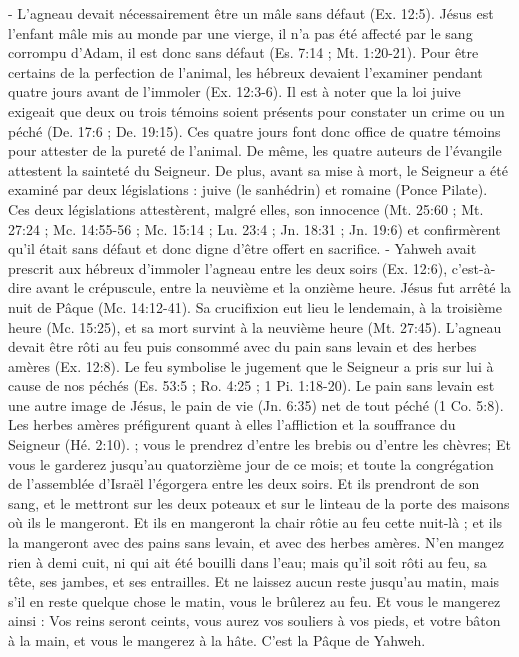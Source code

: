 \begin{multicols}{2}
{- L’agneau devait nécessairement être un mâle sans défaut (Ex. 12:5). Jésus est l’enfant mâle mis au monde par une vierge, il n’a pas été affecté par le sang corrompu d’Adam, il est donc sans défaut (Es. 7:14 ; Mt. 1:20-21). Pour être certains de la perfection de l’animal, les hébreux  devaient l’examiner pendant quatre jours avant de l’immoler (Ex. 12:3-6). Il est à noter que la loi juive exigeait que deux ou trois témoins soient présents pour constater un crime ou un péché (De. 17:6 ; De. 19:15). Ces quatre jours font donc office de quatre témoins pour attester de la pureté de l’animal. De même, les quatre auteurs de l’évangile attestent la sainteté du Seigneur. De plus, avant sa mise à mort, le Seigneur a été examiné par deux législations : juive (le sanhédrin) et  romaine (Ponce Pilate). Ces deux législations attestèrent, malgré elles, son innocence (Mt. 25:60 ;  Mt. 27:24 ; Mc. 14:55-56 ; Mc. 15:14 ; Lu. 23:4 ; Jn. 18:31 ; Jn. 19:6) et confirmèrent qu’il était sans défaut et donc digne d’être offert en sacrifice.
- Yahweh avait prescrit aux hébreux d’immoler l’agneau entre les deux soirs (Ex. 12:6), c’est-à-dire avant le crépuscule, entre  la neuvième et la onzième heure. Jésus fut arrêté la nuit de Pâque (Mc. 14:12-41). Sa crucifixion eut lieu le lendemain, à  la troisième heure (Mc. 15:25), et sa mort survint à la neuvième heure (Mt. 27:45). L’agneau devait être rôti au feu puis consommé avec du pain sans levain et des herbes amères (Ex. 12:8). Le feu symbolise le jugement que le Seigneur a pris sur lui à cause de nos péchés (Es. 53:5 ; Ro. 4:25 ; 1 Pi. 1:18-20). Le pain sans levain est une autre image de Jésus, le pain de vie (Jn. 6:35) net de tout péché (1 Co. 5:8). Les herbes amères préfigurent quant à elles l’affliction et la souffrance du Seigneur (Hé. 2:10).} ; vous le prendrez d'entre les brebis ou d'entre les chèvres;
Et vous le garderez jusqu'au quatorzième jour de ce mois; et toute la congrégation de l'assemblée d'Israël l’égorgera entre les deux soirs.
 Et ils prendront de son sang, et le mettront sur les deux poteaux et sur le linteau de la porte des maisons où ils le mangeront.
 Et ils en mangeront la chair rôtie au feu cette nuit-là ; et ils la mangeront avec des pains sans levain, et avec des herbes amères.
N'en mangez rien à demi cuit, ni qui ait été bouilli dans l'eau; mais qu'il soit rôti au feu, sa tête, ses jambes, et ses entrailles.
 Et ne laissez aucun reste jusqu’au matin, mais  s'il en reste quelque chose le matin, vous le brûlerez au feu.
Et vous le mangerez ainsi : Vos reins seront ceints, vous aurez vos souliers à vos pieds, et votre bâton à la main, et vous le mangerez à la hâte. C'est la Pâque de Yahweh.

\end{multicols}
